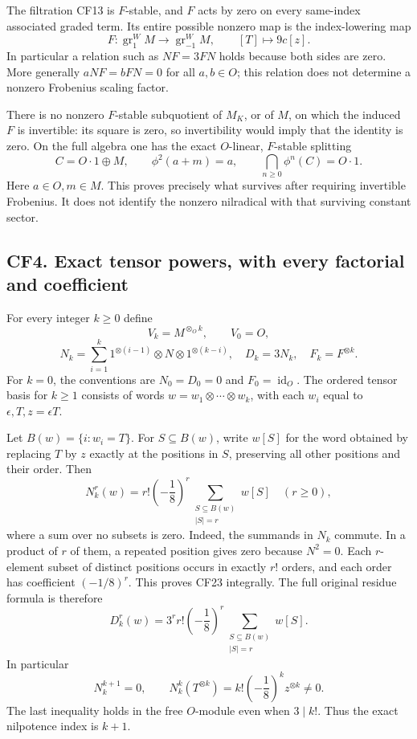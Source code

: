 \documentclass[
  10pt,
]{article}
\begin{document}
The filtration CF13 is \(F\)-stable, and \(F\) acts by zero on every
same-index associated graded term. Its entire possible nonzero map is
the index-lowering map \[
 F:\operatorname{gr}^W_1M\longrightarrow\operatorname{gr}^W_{-1}M,
 \qquad [T]\longmapsto 9c[z].
 \tag{CF20}
\] In particular a relation such as \(NF=3FN\) holds because both sides
are zero. More generally \(aNF=bFN=0\) for all \(a,b\in O\); this
relation does not determine a nonzero Frobenius scaling factor.

There is no nonzero \(F\)-stable subquotient of \(M_K\), or of \(M\), on
which the induced \(F\) is invertible: its square is zero, so
invertibility would imply that the identity is zero. On the full algebra
one has the exact \(O\)-linear, \(F\)-stable splitting \[
 C=O\cdot1\oplus M,
 \qquad \phi^2(a+m)=a,
 \qquad \bigcap_{n\geq0}\phi^n(C)=O\cdot1.
 \tag{CF21}
\] Here \(a\in O,m\in M\). This proves precisely what survives after
requiring invertible Frobenius. It does not identify the nonzero
nilradical with that surviving constant sector.

\subsection{CF4. Exact tensor powers, with every factorial and
coefficient}\label{cf4.-exact-tensor-powers-with-every-factorial-and-coefficient}

For every integer \(k\geq0\) define \[
 V_k=M^{\otimes_O k},\qquad V_0=O,
\] \[
 N_k=\sum_{i=1}^k
 1^{\otimes(i-1)}\otimes N\otimes1^{\otimes(k-i)},
 \quad D_k=3N_k,
 \quad F_k=F^{\otimes k}.
 \tag{CF22}
\] For \(k=0\), the conventions are \(N_0=D_0=0\) and
\(F_0=\operatorname{id}_O\). The ordered tensor basis for \(k\geq1\)
consists of words \(w=w_1\otimes\cdots\otimes w_k\), with each \(w_i\)
equal to \(\epsilon,T,z=\epsilon T\).

Let \(B(w)=\{i:w_i=T\}\). For \(S\subseteq B(w)\), write \(w[S]\) for
the word obtained by replacing \(T\) by \(z\) exactly at the positions
in \(S\), preserving all other positions and their order. Then \[
 \boxed{N_k^r(w)=r!\left(-\frac18\right)^r
 \sum_{\substack{S\subseteq B(w)\\|S|=r}}w[S]}
 \quad(r\geq0),
 \tag{CF23}
\] where a sum over no subsets is zero. Indeed, the summands in \(N_k\)
commute. In a product of \(r\) of them, a repeated position gives zero
because \(N^2=0\). Each \(r\)-element subset of distinct positions
occurs in exactly \(r!\) orders, and each order has coefficient
\((-1/8)^r\). This proves CF23 integrally. The full original residue
formula is therefore \[
 \boxed{D_k^r(w)=3^r r!\left(-\frac18\right)^r
 \sum_{\substack{S\subseteq B(w)\\|S|=r}}w[S].}
 \tag{CF24}
\] In particular \[
 N_k^{k+1}=0,\qquad
 N_k^k(T^{\otimes k})=k!\left(-\frac18\right)^kz^{\otimes k}\neq0.
 \tag{CF25}
\] The last inequality holds in the free \(O\)-module even when
\(3\mid k!\). Thus the exact nilpotence index is \(k+1\).
\end{document}
